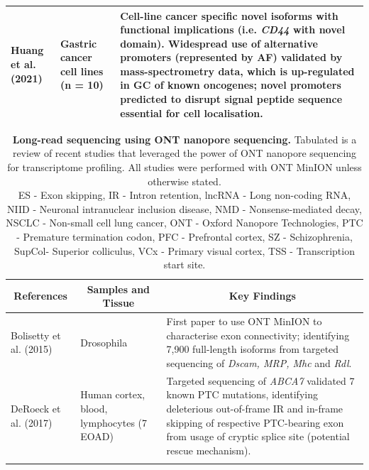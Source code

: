 \begin{landscape}
\begin{longtable}[c]{p{4cm}p{4cm}p{18cm}}
		\centering Huang et al. (2021) \cite{Huang2021} &
		\centering Gastric cancer cell lines (n = 10) &
		\tabitem Cell-line cancer specific novel isoforms with functional implications (i.e. \textit{CD44} with novel domain). \newline
		\tabitem Widespread use of alternative promoters (represented by AF) validated by mass-spectrometry data, which is up-regulated in GC of known oncogenes; novel promoters predicted to disrupt signal peptide sequence essential for cell localisation.   \\* \bottomrule
	\end{longtable}
	\clearpage
	\begin{longtable}[c]{p{4cm}p{4cm}p{18cm}}
		\caption[Long-read sequencing using ONT nanopore sequencing]%
		{\textbf{Long-read sequencing using ONT nanopore sequencing.} Tabulated is a review of recent studies that leveraged the power of ONT nanopore sequencing for transcriptome profiling. All studies were performed with ONT MinION unless otherwise stated. \newline ES - Exon skipping, IR - Intron retention, lncRNA - Long non-coding RNA, NIID - Neuronal intranuclear inclusion disease, NMD - Nonsense-mediated decay, NSCLC - Non-small cell lung cancer, ONT - Oxford Nanopore Technologies, PTC - Premature termination codon, PFC - Prefrontal cortex, SZ - Schizophrenia, SupCol- Superior colliculus, VCx - Primary visual cortex, TSS - Transcription start site.}
		\label{tab: longread_ontstudies}\\
		
		\toprule
		\multicolumn{1}{c}{References} &
		\multicolumn{1}{c}{Samples and Tissue} &
		\multicolumn{1}{c}{Key Findings} \\* \midrule
		\endfirsthead
		\endhead
		\bottomrule
		\endfoot
		\endlastfoot
		\centering Bolisetty et al. (2015)\cite{Bolisetty2015} &
		\centering Drosophila &
		\tabitem First paper to use ONT MinION to characterise exon connectivity; identifying 7,900 full-length isoforms from targeted sequencing of \textit{Dscam, MRP, Mhc} and \textit{Rdl}.  \\
		\hdashline[0.5pt/5pt]
		
		\centering DeRoeck et al. (2017)\cite{DeRoeck2017}  &
		\centering Human cortex, blood, lymphocytes (7 EOAD) &
		\tabitem Targeted sequencing of \textit{ABCA7} validated 7 known PTC mutations, identifying deleterious out-of-frame IR and in-frame skipping of respective PTC-bearing exon from usage of cryptic splice site (potential rescue mechanism). \\
		\hdashline[0.5pt/5pt]
		

\end{longtable}
\end{landscape}
